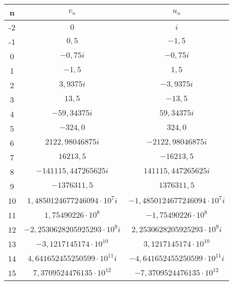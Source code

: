 \begin{center}
\begin{tabular}{c || c | c}
n    & $v_n$                            & $u_n$
\\\hline\hline
  -2 & $0$                              & $i$
\\-1 & $0,5$                            & $-1,5 $
\\0  & $-0,75i$                         & $-0,75i$
\\1  & $-1,5$                           & $1,5$
\\2  & $3,9375i$                        & $-3,9375i$
\\3  & $13,5$                           & $-13,5$
\\4  & $-59,34375i$                     & $59,34375i$
\\5  & $-324,0$                         & $324,0$
\\6  & $2122,98046875i$                 & $-2122,98046875i$
\\7  & $16213,5$                        & $-16213,5$
\\8  & $-141115,447265625i$             & $141115,447265625i$
\\9  & $-1376311,5$                     & $1376311,5$
\\10 & $1,4850124677246094\cdot10^7i$   & $-1,4850124677246094\cdot10^7i$
\\11 & $1,75490226\cdot10^8$            & $-1,75490226\cdot10^8$
\\12 & $-2,2530628205925293\cdot10^9i$  & $2,2530628205925293\cdot10^9i$
\\13 & $-3,1217145174\cdot10^{10}$      & $3,1217145174\cdot10^{10}$
\\14 & $4,641652455250599\cdot10^{11}i$ & $-4,641652455250599\cdot10^{11}i$
\\15 & $7,3709524476135\cdot10^{12}$    & $-7,3709524476135\cdot10^{12}$
\end{tabular}
\end{center}

